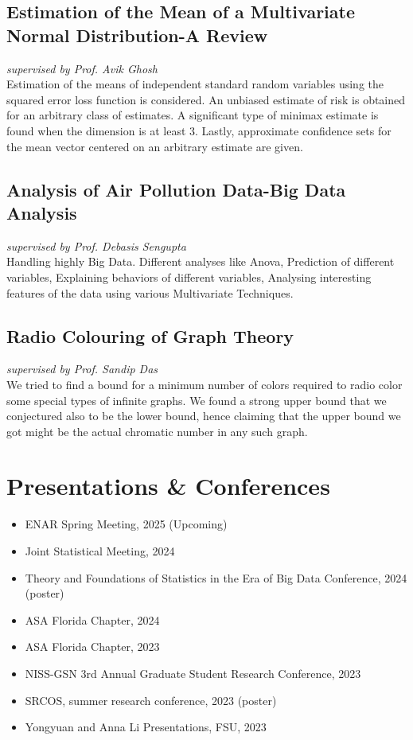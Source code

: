 \documentclass[11pt,a4paper]{article}
\begin{document}
\subsection{Estimation of the Mean of a Multivariate Normal Distribution-A Review}
\textit{supervised by Prof. Avik Ghosh}\\
Estimation of the means of independent standard random variables using the squared error loss function is considered. An unbiased estimate of risk is obtained for an arbitrary class of estimates. A significant type of minimax estimate is found when the dimension is at least 3. Lastly, approximate confidence sets for the mean vector centered on an arbitrary estimate are given.

\subsection{Analysis of Air Pollution Data-Big Data Analysis}
\textit{supervised by Prof. Debasis Sengupta}\\
Handling highly Big Data. Different analyses like Anova, Prediction of different variables, Explaining behaviors of different variables, Analysing interesting features of the data using various Multivariate Techniques.

\subsection{Radio Colouring of Graph Theory}
\textit{supervised by Prof. Sandip Das}\\
We tried to find a bound for a minimum number of colors required to radio color some special types of infinite graphs. We found a strong upper bound that we conjectured also to be the lower bound, hence claiming that the upper bound we got might be the actual chromatic number in any such graph.

\section{Presentations \& Conferences}

\begin{itemize}[leftmargin=*]
  \item ENAR Spring Meeting, 2025 (Upcoming)
  \item Joint Statistical Meeting, 2024
  \item Theory and Foundations of Statistics in the Era of Big Data Conference, 2024 (poster)
  \item ASA Florida Chapter, 2024
  \item ASA Florida Chapter, 2023
  \item NISS-GSN 3rd Annual Graduate Student Research Conference, 2023
  \item SRCOS, summer research conference, 2023 (poster)
  \item Yongyuan and Anna Li Presentations, FSU, 2023
\end{itemize}
\end{document}
